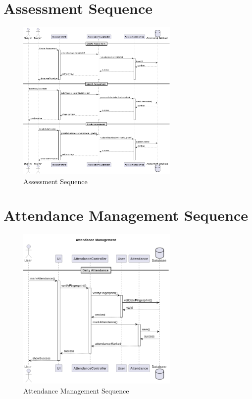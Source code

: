 \documentclass[12pt,a4paper]{report}
\begin{document}
\section{Assessment Sequence}
\begin{figure}[htbp]
    \centering
    \includegraphics[width=0.7\textwidth]{assessment-sequence.png}
    \caption{Assessment Sequence}
    \label{fig:assessment-sequence}
\end{figure}

\section{Attendance Management Sequence}
\begin{figure}[htbp]
    \centering
    \includegraphics[width=0.7\textwidth]{attendance-management-sequence.png}
    \caption{Attendance Management Sequence}
    \label{fig:attendance-management-sequence}
\end{figure}
\end{document}
